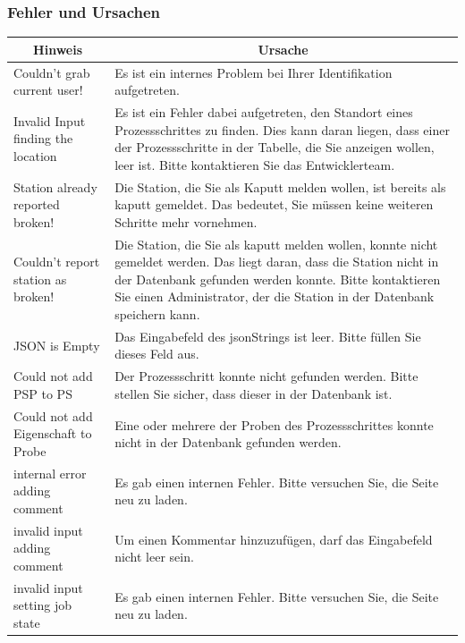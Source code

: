 \documentclass[enabledeprecatedfontcommands,fontsize=12pt,paper=a4,twoside]{scrartcl}
\begin{document}
\subsubsection{Fehler und Ursachen}
\begin{longtable}[c]{|p{5cm}|p{10cm}|}
\hline
\multicolumn{1}{|c|}{\textbf{Hinweis}}                          & \multicolumn{1}{c|}{\textbf{Ursache}}                                                                                                                                                                                                               \\ \hline
\endhead
Couldn't grab current user! & Es ist ein internes Problem bei Ihrer Identifikation aufgetreten. \\ \hline
Invalid Input finding the location & Es ist ein Fehler dabei aufgetreten, den Standort eines Prozessschrittes zu finden. Dies kann daran liegen, dass einer der Prozessschritte in der Tabelle, die Sie anzeigen wollen, leer ist. Bitte kontaktieren Sie das Entwicklerteam.  \\ \hline
Station already reported broken! & Die Station, die Sie als Kaputt melden wollen, ist bereits als kaputt gemeldet. Das bedeutet, Sie müssen keine weiteren Schritte mehr vornehmen. \\ \hline
Couldn't report station as broken! & Die Station, die Sie als kaputt melden wollen, konnte nicht gemeldet werden. Das liegt daran, dass die Station nicht in der Datenbank gefunden werden konnte. Bitte kontaktieren Sie einen Administrator, der die Station in der Datenbank speichern kann. \\ \hline
JSON is Empty & Das Eingabefeld des jsonStrings ist leer. Bitte füllen Sie dieses Feld aus. \\ \hline
Could not add PSP to PS & Der Prozessschritt konnte nicht gefunden werden. Bitte stellen Sie sicher, dass dieser in der Datenbank ist. \\ \hline
Could not add Eigenschaft to Probe & Eine oder mehrere der Proben des Prozessschrittes konnte nicht in der Datenbank gefunden werden.  \\ \hline
internal error adding comment & Es gab einen internen Fehler. Bitte versuchen Sie, die Seite neu zu laden. \\ \hline
invalid input adding comment & Um einen Kommentar hinzuzufügen, darf das Eingabefeld nicht leer sein. \\ \hline
invalid input setting job state & Es gab einen internen Fehler. Bitte versuchen Sie, die Seite neu zu laden. \\ \hline

\end{longtable}
\end{document}
